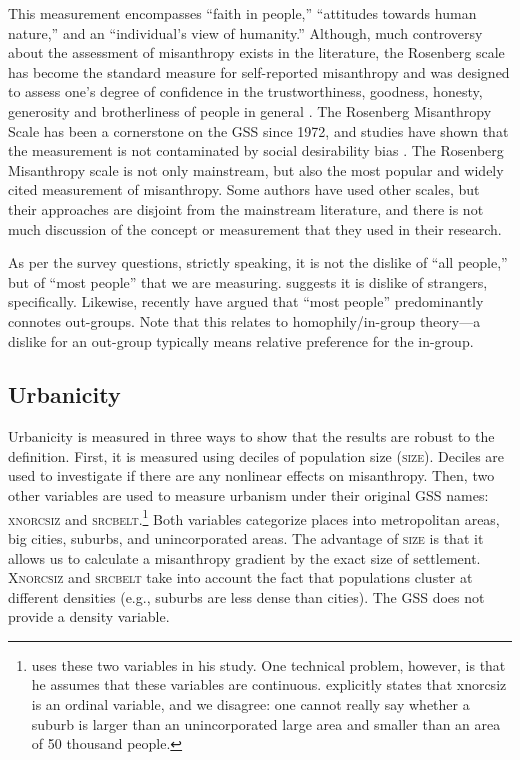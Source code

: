 \documentclass[11pt, letterpaper]{article}
\begin{document}
\begin{spacing}{1.4}
This measurement encompasses ``faith in people,'' ``attitudes towards human nature,'' and an ``individual's view of humanity.'' Although, much controversy about the assessment of misanthropy exists in the literature, the Rosenberg scale has become the standard measure for self-reported misanthropy and was designed to assess one's degree of confidence in the trustworthiness, goodness, honesty, generosity and brotherliness of people in general \citep{rosenberg56}. The Rosenberg Misanthropy Scale has been a cornerstone on the GSS since 1972, and studies have shown that the measurement is not contaminated by social desirability bias \citep{ray81}. 
The Rosenberg Misanthropy scale is not only mainstream, but also the most popular and widely cited measurement of misanthropy. Some authors   \citep[e.g.,][]{wuensch2002misanthropy} have used other scales, but their approaches are disjoint from the mainstream literature, and there is not much discussion of the concept or measurement that they used in their research.  

As per the survey questions, strictly speaking, it is not the dislike of ``all people,'' but of ``most people''  that we are measuring. \citet{wilson85} suggests it is dislike of strangers, specifically. Likewise, recently \citet{delhey11} have argued that ``most people'' predominantly connotes out-groups. Note that this relates to homophily/in-group theory---a dislike for an out-group typically means relative preference for the in-group. 

 
\subsection*{Urbanicity}

Urbanicity is measured in three ways to show that the
results are robust to the definition. First, it is measured using deciles of population size
(\textsc{size}). Deciles are used to investigate if there are any nonlinear
effects on misanthropy. Then, two other variables are used to measure urbanism under their original GSS names: \textsc{xnorcsiz} and \textsc{srcbelt}.\footnote{\citet{wilson85} uses these two variables in his study. One technical problem, however, is that he assumes that these variables are continuous. \citet{wilson85} explicitly states that xnorcsiz is an ordinal variable, and we disagree: one cannot really say whether a suburb is larger than an unincorporated large area and smaller than an area of 50 thousand people.} Both variables categorize places into metropolitan areas, big cities, suburbs, and  unincorporated areas. The advantage of \textsc{size} is that it allows us to calculate a misanthropy 
 gradient by the exact size of settlement. \textsc{Xnorcsiz} and \textsc{srcbelt} take into account the fact that populations cluster at different densities (e.g., suburbs are less dense than cities). The GSS does not provide a density variable. 


\end{spacing}
\end{document}

